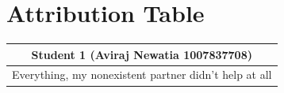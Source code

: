 \documentclass{article}
\begin{document}
\section{Attribution Table}

\begin{center}
\begin{tabular}{|| c ||}
\hline
 Student 1 (Aviraj Newatia 1007837708) \\ 
 \hline
 Everything, my nonexistent partner didn't help at all \\ 
 \hline
\end{tabular}
\end{center}
\end{document}
